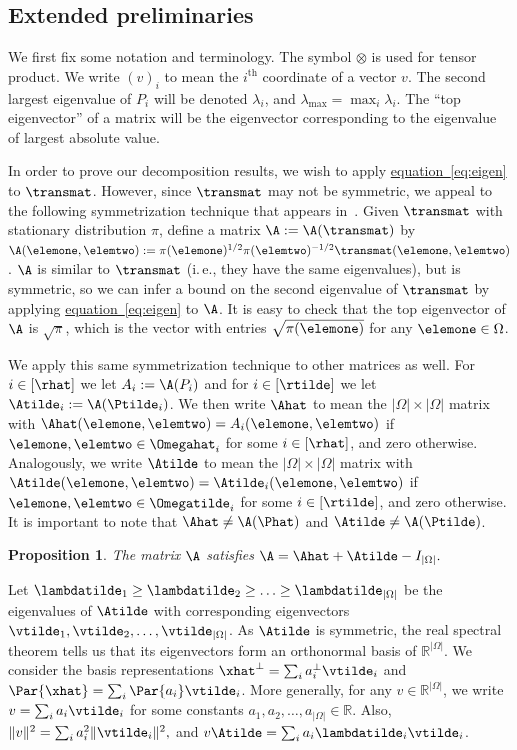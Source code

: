 \documentclass[11pt]{article}
\newtheorem{proposition}[theorem]{Proposition}
\providecommand{\R}{{\mathbb R}}
\providecommand{\ie}{i.\,e.}
\providecommand{\expeqref}[2]{\texorpdfstring{\hyperref[#2]{#1~\eqref{#2}}}{#1~\eqref{#2}}}
\providecommand{\Perp}[1]{#1^{\perp}}
\begin{document}
%
\subsection{Extended preliminaries}  %
\label{sec:decompPrelim}

We first fix some notation and terminology. The symbol $\otimes$ is 
used for tensor product.  We write $(v)_i$ to mean the $i^{\text{th}}$ 
coordinate of a vector $v$. The second largest eigenvalue of $P_i$ will 
be denoted $\lambda_i$, and $\lambda_{\max} = \max_i \lambda_i$. The 
``top eigenvector'' of a matrix will be the eigenvector corresponding 
to the eigenvalue of largest absolute value.

In order to prove our decomposition results, we wish to apply 
\expeqref{equation}{eq:eigen} to $\transmat$.  However, since $\transmat$ may 
not be symmetric, we appeal to the following symmetrization technique 
that appears in~\cite[p. 153]{LPW06}. Given $\transmat$ with stationary 
distribution $\pi$, define a matrix $\A := \A(\transmat)$ by 
$\A(\elemone,\elemtwo) :=\pi(\elemone)^{1/2}\pi(\elemtwo)^{-1/2}\transmat(\elemone,\elemtwo)$. 
$\A$ is similar to $\transmat$ (\ie,  they have the same eigenvalues), 
but is symmetric, so we can infer a bound on the second eigenvalue of 
$\transmat$ by applying \expeqref{equation}{eq:eigen} to $\A$. It is easy to 
check that the top eigenvector of $\A$ is $\sqrt{\pi}$, which is the 
vector with entries $\sqrt{\pi(\elemone)}$ for any $\elemone\in\Omega$. 

We apply this same symmetrization technique to other matrices as well. 
For $i \in [\rhat]$ we let $A_i := \A(P_i)$ and for $i \in 
[\rtilde]$ we let $\Atilde_i := \A(\Ptilde_i)$.  We then write $\Ahat$ 
to mean the $|\Omega| \times |\Omega|$ matrix with 
$\Ahat(\elemone,\elemtwo) = A_i(\elemone,\elemtwo)$ if 
$\elemone,\elemtwo \in \Omegahat_i$ for some $i \in [\rhat]$, and zero 
otherwise. Analogously, we write $\Atilde$ to mean the $|\Omega| \times 
|\Omega|$ matrix with $\Atilde(\elemone,\elemtwo) = 
\Atilde_i(\elemone,\elemtwo)$ if $\elemone,\elemtwo \in \Omegatilde_i$ 
for some $i \in [\rtilde]$, and zero otherwise. It is important to note 
that $\Ahat \not= \A(\Phat)$ and 
$\Atilde \not= \A(\Ptilde)$.  
\begin{proposition}\label{prop:matdecomp}
The matrix $\A$ satisfies 
$\A = \Ahat+\Atilde-I_{|\Omega|}.$
\end{proposition}

Let $\lambdatilde_1\geq\lambdatilde_2\geq\ldots\geq 
\lambdatilde_{|\Omega|}$ be the eigenvalues of $\Atilde$ with 
corresponding eigenvectors $\vtilde_1,\vtilde_2,\ldots, 
\vtilde_{|\Omega|}$.  As $\Atilde$ is symmetric, the real spectral 
theorem tells us that its eigenvectors form an orthonormal basis of 
$\R^{|\Omega|}$.  We consider the basis representations $\Perp{\xhat} = 
\sum_i\Perp{a_i}\vtilde_i$ and $\Par{\xhat} = 
\sum_i\Par{a_i}\vtilde_i$.  More generally, for any $v \in 
\R^{|\Omega|}$, we write  $v=\sum_{i}a_i\vtilde_i$ for some constants 
$a_1,a_2,\ldots, a_{|\Omega|} \in \R$.  Also, $\|v\|^2 = \sum_i 
a_i^2\|\vtilde_i\|^2,$ and $v\Atilde = \sum_i 
a_i\lambdatilde_i\vtilde_i$.
\end{document}
